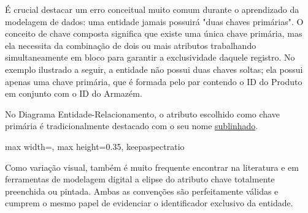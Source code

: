 É crucial destacar um erro conceitual muito comum durante o aprendizado da modelagem de dados: uma entidade jamais possuirá "duas chaves primárias". O conceito de chave composta significa que existe uma única chave primária, mas ela necessita da combinação de dois ou mais atributos trabalhando simultaneamente em bloco para garantir a exclusividade daquele registro. No exemplo ilustrado a seguir, a entidade não possui duas chaves soltas; ela possui apenas uma chave primária, que é formada pelo par contendo o ID do Produto em conjunto com o ID do Armazém.

No Diagrama Entidade-Relacionamento, o atributo escolhido como chave primária é tradicionalmente destacado com o seu nome \underline{sublinhado}.

\begin{diagramER}
    \begin{center}
    \begin{adjustbox}{max width=\linewidth, max height=0.35\textheight, keepaspectratio}
\end{adjustbox}
    \end{center}
\end{diagramER}

Como variação visual, também é muito frequente encontrar na literatura e em ferramentas de modelagem digital a elipse do atributo chave totalmente preenchida ou pintada. Ambas as convenções são perfeitamente válidas e cumprem o mesmo papel de evidenciar o identificador exclusivo da entidade.

